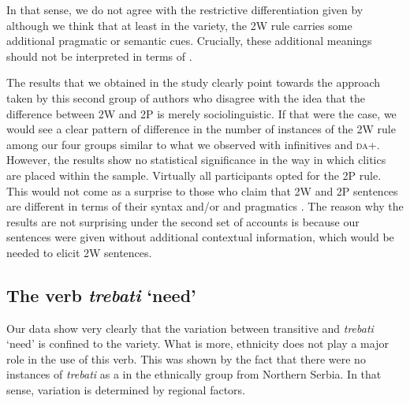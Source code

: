 \documentclass[output=paper,modfonts,newtxmath,hidelinks,]{langscibook}
\begin{document}
\ea \label{7:ex18}
	\z
\z

\noindent In that sense, we do not agree with the restrictive differentiation given by \citet{DiesingEtAl2009} although we think that at least in the  variety, the 2W rule carries some additional pragmatic or semantic cues. Crucially, these additional meanings should not be interpreted in terms of . 

The results that we obtained in the study clearly point towards the approach taken by this second group of authors who disagree with the idea that the difference between 2W and 2P is merely sociolinguistic. If that were the case, we would see a clear pattern of difference in the number of instances of the 2W rule among our four groups similar to what we observed with infinitives and \textsc{da}+. However, the results show no statistical significance in the way in which clitics are placed within the sample. Virtually all participants opted for the 2P rule. This would not come as a surprise to those who claim that 2W and 2P sentences are different in terms of their syntax \citep{Boskovic2009} and/or  and pragmatics \citep{DiesingEtAl2009}. The reason why the results are not surprising under the second set of accounts is because our sentences were given without additional contextual information, which would be needed to elicit 2W sentences.

\subsection{The verb \textit{trebati} ‘need’}\label{7:s4.3}

Our data show very clearly that the variation between transitive and  \textit{trebati} ‘need’ is confined to the  variety. What is more, ethnicity does not play a major role in the use of this verb. This was shown by the fact that there were no instances of \textit{trebati} as a  in the ethnically  group from Northern Serbia. In that sense, variation is determined by regional factors.
\end{document}
